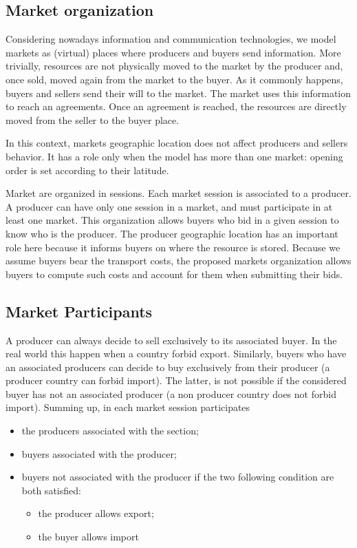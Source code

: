 \documentclass{article}
\begin{document}
\subsection{Market organization}
Considering nowadays information and communication technologies, we model markets as (virtual) places where producers and buyers send information. More trivially, resources are not physically moved to the market by the producer and, once sold, moved again from the market to the buyer. As it commonly happens, buyers and sellers send their will to the market. The market uses this information to reach an agreements. Once an agreement is reached, the resources are directly moved from the seller to the buyer place.

In this context, markets geographic location does not affect producers and sellers behavior. It has a role only when the model has more than one market: opening order is set according to their latitude.

Market are organized in sessions. Each market session is associated to a producer. A producer can have only one session in a market, and must participate in at least one market. This organization allows buyers who bid in a given session to know who is the producer. The producer geographic location has an important role here because it informs buyers on where the resource is stored. Because we assume buyers bear the transport costs, the proposed markets organization allows buyers to compute such costs and account for them when submitting their bids.
\subsection{Market Participants}
A producer can always decide to sell exclusively to its associated buyer. In the real world this happen when a country forbid export. Similarly, buyers who have an associated producers can decide to buy exclusively from their producer (a producer country can forbid import). The latter, is not possible if the considered buyer has not an associated producer (a non producer country does not forbid import). 
Summing up, in each market session participates 
\begin{itemize}
	\item the producers associated with the section;
	\item buyers associated with the producer;
	\item buyers not associated with the producer if the two following condition are both satisfied:
		\begin{itemize}
			\item the producer allows export;
			\item the buyer allows import
		\end{itemize}
\end{itemize}
\end{document}
